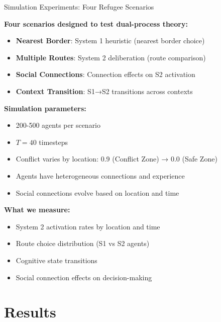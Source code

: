 \documentclass[aspectratio=169]{beamer}
\begin{document}
\begin{frame}{Simulation Experiments: Four Refugee Scenarios}

\textbf{Four scenarios designed to test dual-process theory:}
\begin{itemize}
    \item \textbf{Nearest Border}: System 1 heuristic (nearest border choice)
    \item \textbf{Multiple Routes}: System 2 deliberation (route comparison)
    \item \textbf{Social Connections}: Connection effects on S2 activation
    \item \textbf{Context Transition}: S1→S2 transitions across contexts
\end{itemize}

\vspace{0.5em}

\textbf{Simulation parameters:}
\begin{itemize}
    \item 200-500 agents per scenario
    \item $T=40$ timesteps
    \item Conflict varies by location: 0.9 (Conflict Zone) → 0.0 (Safe Zone)
    \item Agents have heterogeneous connections and experience
    \item Social connections evolve based on location and time
\end{itemize}

\vspace{0.5em}

\textbf{What we measure:}
\begin{itemize}
    \item System 2 activation rates by location and time
    \item Route choice distribution (S1 vs S2 agents)
    \item Cognitive state transitions
    \item Social connection effects on decision-making
\end{itemize}

\end{frame}

\section{Results}
\end{document}
